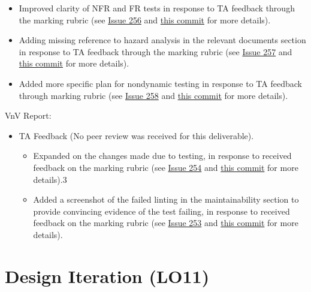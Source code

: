 \documentclass{article}
\begin{document}
\begin{itemize}
\begin{itemize}
		\item Improved clarity of NFR and FR tests in response to TA feedback through the marking rubric (see \href{https://github.com/davimang/REACH/issues/256}{Issue 256} and \href{https://github.com/davimang/REACH/commit/ce52fb62cb65dd884ee3c7afac4c7a684d84b771}{this commit} for more details).
		\item Adding missing reference to hazard analysis in the relevant documents section in response to TA feedback through the marking rubric (see \href{https://github.com/davimang/REACH/issues/257}{Issue 257} and \href{https://github.com/davimang/REACH/commit/396e5df0a6208758a45054c8e35b35d37d1cc25f}{this commit} for more details).
		\item Added more specific plan for nondynamic testing in response to TA feedback through marking rubric (see \href{https://github.com/davimang/REACH/issues/258}{Issue 258} and \href{https://github.com/davimang/REACH/commit/3a46bc35ff31855f752df09efb5f4dd5fa4211c7}{this commit} for more details).
	\end{itemize}
\end{itemize}

VnV Report:
\begin{itemize}
	\item TA Feedback (No peer review was received for this deliverable).
	\begin{itemize}
		\item Expanded on the changes made due to testing, in response to received feedback on the marking rubric (see \href{https://github.com/davimang/REACH/issues/254}{Issue 254} and \href{https://github.com/davimang/REACH/commit/06620ec4af39e47e90e0647ae05cda2a58971ab7}{this commit} for more details).3
		\item Added a screenshot of the failed linting in the maintainability section to provide convincing evidence of the test failing, in response to received feedback on the marking rubric (see \href{https://github.com/davimang/REACH/issues/253}{Issue 253} and \href{https://github.com/davimang/REACH/commit/06620ec4af39e47e90e0647ae05cda2a58971ab7}{this commit} for more details).
	\end{itemize}
\end{itemize}


\section{Design Iteration (LO11)}

\end{document}
